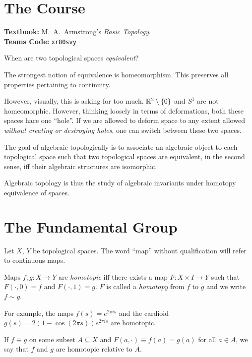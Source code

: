 \chapter*{The Course}

\textbf{Textbook:} M.~A.~Armstrong's \textit{Basic Topology}. \\
\textbf{Teams Code:} \texttt{xr80svy}

\begin{center}
    When are two topological spaces \emph{equivalent}?
\end{center}
The strongest notion of equivalence is homeomorphism.
This preserves all properties pertaining to continuity.

However, visually, this is asking for too much.
$\mathbb{R}^2 \setminus \{0\}$ and $S^1$ are not homeomorphic.
However, thinking loosely in terms of deformations, both these spaces
hace one ``hole''.
If we are allowed to deform space to any extent allowed \emph{without
creating or destroying holes}, one can switch between these two spaces.

The goal of algebraic topologically is to associate an algebraic object to
each topological space such that two topological spaces are equivalent,
in the second sense, iff their algebraic structures are isomorphic.

Algebraic topology is thus the study of algebraic invariants under homotopy
equivalence of spaces.

\chapter{The Fundamental Group} \label{chp:1}
Let $X$, $Y$ be topological spaces.
The word ``map'' without qualification will refer to continuous maps.
\begin{definition*}[Homotopy] \label{def:homotopy}
    Maps $f, g\colon X \to Y$ are \emph{homotopic} iff there exists a map
    $F\colon X \times I \to Y$ such that $F(\cdot, 0) = f$ and
    $F(\cdot, 1) = g$.
    $F$ is called a \emph{homotopy} from $f$ to $g$ and we write $f \sim g$.
\end{definition*}
For example, the maps $f(s) = e^{2\pi i s}$ and the cardioid
$g(s) = 2 (1 - \cos (2\pi s)) e^{2\pi i s}$ are homotopic.

\begin{remark}
    If $f \equiv g$ on some subset $A \subseteq X$ and
    $F(a, \cdot) \equiv f(a) = g(a)$ for all $a \in A$, we say that
    $f$ and $g$ are homotopic relative to $A$.
\end{remark}

